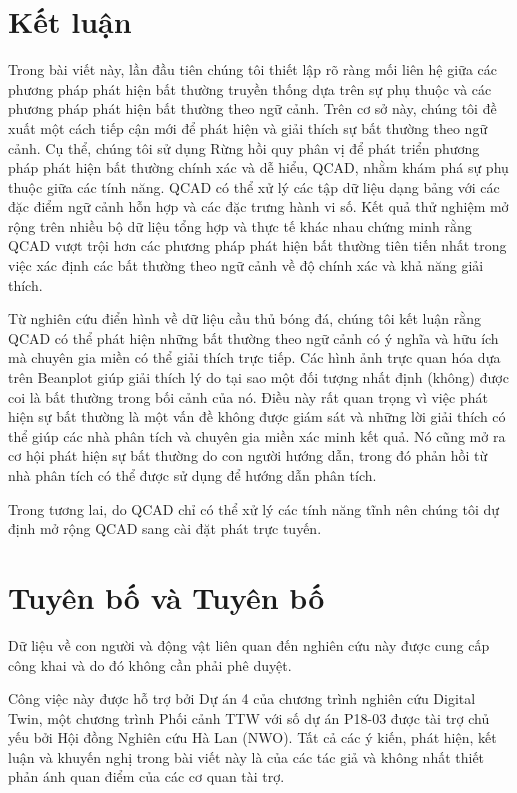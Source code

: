 \section{Kết luận}
\label{sec:conclusion}

Trong bài viết này, lần đầu tiên chúng tôi thiết lập rõ ràng mối liên hệ giữa các phương pháp phát hiện bất thường truyền thống dựa trên sự phụ thuộc và các phương pháp phát hiện bất thường theo ngữ cảnh. Trên cơ sở này, chúng tôi đề xuất một cách tiếp cận mới để phát hiện và giải thích sự bất thường theo ngữ cảnh. Cụ thể, chúng tôi sử dụng Rừng hồi quy phân vị để phát triển phương pháp phát hiện bất thường chính xác và dễ hiểu, QCAD, nhằm khám phá sự phụ thuộc giữa các tính năng. QCAD có thể xử lý các tập dữ liệu dạng bảng với các đặc điểm ngữ cảnh hỗn hợp và các đặc trưng hành vi số. Kết quả thử nghiệm mở rộng trên nhiều bộ dữ liệu tổng hợp và thực tế khác nhau chứng minh rằng QCAD vượt trội hơn các phương pháp phát hiện bất thường tiên tiến nhất trong việc xác định các bất thường theo ngữ cảnh về độ chính xác và khả năng giải thích.

Từ nghiên cứu điển hình về dữ liệu cầu thủ bóng đá, chúng tôi kết luận rằng QCAD có thể phát hiện những bất thường theo ngữ cảnh có ý nghĩa và hữu ích mà chuyên gia miền có thể giải thích trực tiếp. Các hình ảnh trực quan hóa dựa trên Beanplot giúp giải thích lý do tại sao một đối tượng nhất định (không) được coi là bất thường trong bối cảnh của nó. Điều này rất quan trọng vì việc phát hiện sự bất thường là một vấn đề không được giám sát và những lời giải thích có thể giúp các nhà phân tích và chuyên gia miền xác minh kết quả. Nó cũng mở ra cơ hội phát hiện sự bất thường do con người hướng dẫn, trong đó phản hồi từ nhà phân tích có thể được sử dụng để hướng dẫn phân tích.

Trong tương lai, do QCAD chỉ có thể xử lý các tính năng tĩnh nên chúng tôi dự định mở rộng QCAD sang cài đặt phát trực tuyến.

\section*{Tuyên bố và Tuyên bố}



Dữ liệu về con người và động vật liên quan đến nghiên cứu này được cung cấp công khai và do đó không cần phải phê duyệt.

Công việc này được hỗ trợ bởi Dự án 4 của chương trình nghiên cứu Digital Twin, một chương trình Phối cảnh TTW với số dự án P18-03 được tài trợ chủ yếu bởi Hội đồng Nghiên cứu Hà Lan (NWO). Tất cả các ý kiến, phát hiện, kết luận và khuyến nghị trong bài viết này là của các tác giả và không nhất thiết phản ánh quan điểm của các cơ quan tài trợ.

